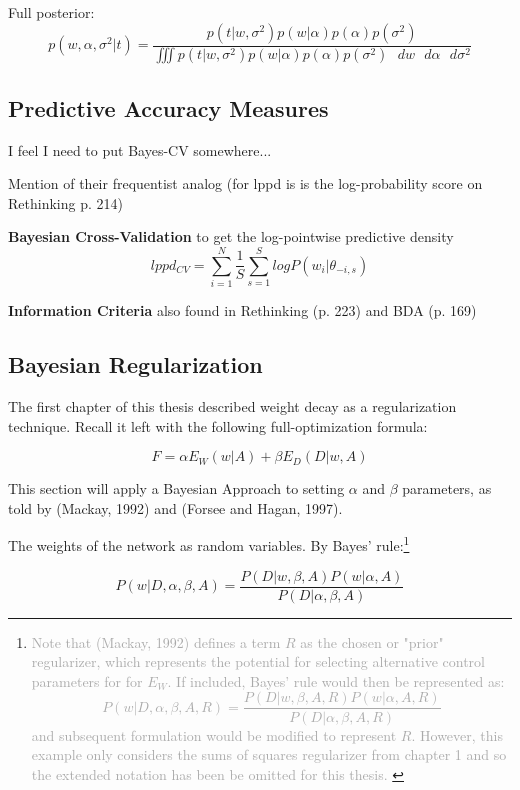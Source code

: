 Full posterior:
$$
p(w,\alpha,\sigma^2|t) = \frac{p(t|w,\sigma^2) p(w|\alpha)p(\alpha)p(\sigma^2)}{\iiint p(t|w,\sigma^2)p(w|\alpha)p(\alpha)p(\sigma^2) \text{ } dw \text{ } d\alpha \text{ } d\sigma^2}
$$





\subsection{Predictive Accuracy Measures}
I feel I need to put Bayes-CV somewhere...

Mention of their frequentist analog (for lppd is is the log-probability score on Rethinking p. 214)

\textbf{Bayesian Cross-Validation} to get the log-pointwise predictive density
$$
lppd_{CV} = \sum_{i=1}^N \frac{1}{S} \sum_{s=1}^S logP(w_i|\theta_{-i,s})
$$

\textbf{Information Criteria} also found in Rethinking (p. 223) and BDA (p. 169)


\subsection{Bayesian Regularization}


The first chapter of this thesis described weight decay as a regularization technique.  Recall it left with the following full-optimization formula:

$$
F = \alpha E_W(w|A) + \beta E_D(D|w,A)
$$



This section will apply a Bayesian Approach to setting $\alpha$ and $\beta$ parameters, as told by (Mackay, 1992) \cite{mackay1992practical} and (Forsee and Hagan, 1997). \cite{foresee1997gauss}

The weights of the network as random variables. By Bayes' rule:\footnote{
\textcolor{darkgray}{
Note that (Mackay, 1992) defines a term $R$ as the chosen or "prior" regularizer, which represents the potential for selecting alternative control parameters for for $E_W$.  If included, Bayes' rule would then be represented  as:
$$
P(w|D,\alpha,\beta,A,R) = \frac{P(D|w,\beta,A,R) P(w|\alpha,A,R)}{P(D|\alpha,\beta,A,R)}
$$
 and subsequent formulation would be modified to represent $R$. However, this example only considers the sums of squares regularizer from chapter 1 and so the extended notation has been be omitted for this thesis.
 }}
 
$$
P(w|D,\alpha,\beta,A) = \frac{P(D|w,\beta,A) P(w|\alpha,A)}{P(D|\alpha,\beta,A)}
$$

